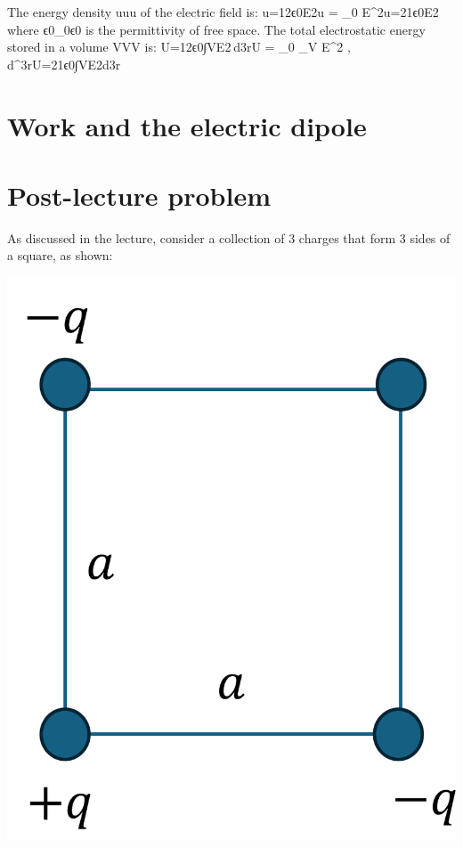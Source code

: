 \documentclass[
  letterpaper,
  DIV=11,
  numbers=noendperiod]{scrreprt}
\begin{document}
The energy density uuu of the electric field is: u=12ϵ0E2u = 
\epsilon\_0 E\^{}2u=21ϵ0E2 where ϵ0\epsilon\_0ϵ0 is the permittivity of
free space. The total electrostatic energy stored in a volume VVV is:
U=12ϵ0∫VE2 d3rU =  \epsilon\_0 \int\_V E\^{}2 ,
d\^{}3rU=21ϵ0∫VE2d3r

\section{Work and the electric
dipole}\label{work-and-the-electric-dipole}

\section{Post-lecture problem}\label{post-lecture-problem-2}

As discussed in the lecture, consider a collection of 3 charges that
form 3 sides of a square, as shown:

\includegraphics{Figures/L3_3charges.png}
\end{document}
